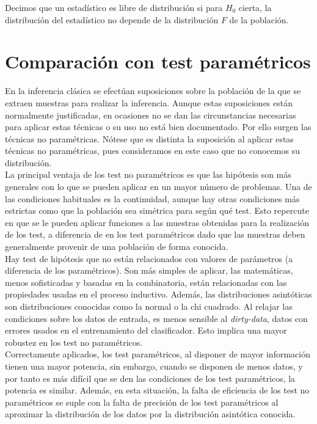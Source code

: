 \begin{definicion}
	Decimos que un estadístico es libre de distribución si 
para $H_0$ cierta, la distribución del estadístico no depende 
de la distribución $F$ de la población.
\end{definicion}
	
\section{Comparación con test paramétricos}
	
	En la inferencia clásica se efectúan suposiciones sobre 
la población de la que se extraen muestras para realizar la 
inferencia. Aunque estas suposiciones están normalmente 
justificadas, en ocasiones no se dan las circunstancias 
necesarias para aplicar estas técnicas o su uso no está bien 
documentado. Por ello surgen las técnicas no paramétricas. 
Nótese que es distinta la suposición al aplicar estas 
técnicas no paramétricas, pues consideramos en este caso que 
no conocemos su distribución.\\
 	La principal ventaja de los test no paramétricos es que  
las hipótesis son más generales con lo que se pueden aplicar 
en un mayor número de problemas. Una de las condiciones 
habituales es la continuidad, aunque hay otras condiciones 
más estrictas como que la población sea simétrica para según 
qué test. Esto repercute en que se le pueden aplicar 
funciones a las muestras obtenidas para la realización de los 
test, a diferencia de en los test paramétricos dado que las 
muestras deben generalmente provenir de una población de 
forma conocida.\\
	Hay test de hipótesis que no están relacionados con 
valores de parámetros (a diferencia de los paramétricos). Son 
más simples de aplicar, las matemáticas, menos sofisticadas y 
basadas en la combinatoria, están relacionadas con las 
propiedades usadas en el proceso inductivo. 
Además, las distribuciones asintóticas son 
distribuciones conocidas como la normal o la chi cuadrado. Al 
relajar las condiciones sobre los datos de entrada, es menos 
sensible al \textit{dirty-data}, datos con errores usados en 
el entrenamiento del clasificador. Esto implica una mayor 
robustez en los test no paramétricos.\\
 	Correctamente aplicados, los test paramétricos, al 
disponer de mayor información tienen una mayor potencia, sin 
embargo, cuando se disponen de menos datos, y por tanto es 
más difícil que se den las condiciones de los test 
paramétricos, la potencia es similar. Además, en esta 
situación, la falta de eficiencia de los test no paramétricos 
se suple con la falta de precisión de los test paramétricos 
al aproximar la distribución de los datos por la distribución 
asintótica conocida.\\


